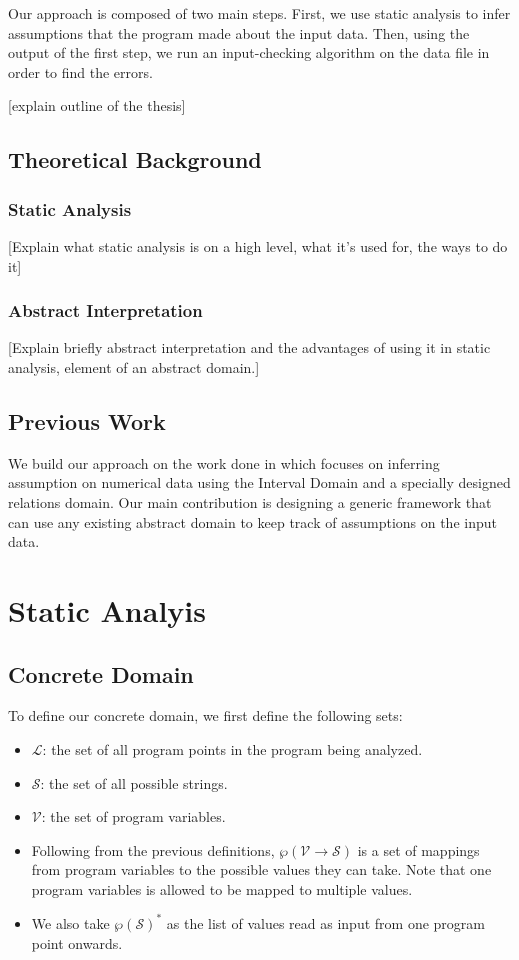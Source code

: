 \documentclass[]{report}
\begin{document}
Our approach is composed of two main steps. First, we use static analysis to infer assumptions that the program made about the input data. Then, using the output of the first step, we run an input-checking algorithm on the data file in order to find the errors. 

[explain outline of the thesis]

\section{Theoretical Background}
\subsection{Static Analysis}
[Explain what static analysis is on a high level, what it's used for, the ways to do it]
\subsection{Abstract Interpretation}
[Explain briefly abstract interpretation and the advantages of using it in static analysis, element of an abstract domain.]

\section{Previous Work}

We build our approach on the work done in \cite{madelin} which focuses on inferring assumption on numerical data using the Interval Domain and a specially designed relations domain. Our main contribution is designing a generic framework that can use any existing abstract domain to keep track of assumptions on the input data. 

\chapter{Static Analyis}

\section{Concrete Domain}

To define our concrete domain, we first define the following sets:
\begin{itemize}
	\item $\mathcal{L}$: the set of all program points in the program being analyzed. 
	\item $\mathcal{S}$: the set of all possible strings. 
	\item $\mathcal{V}$: the set of program variables.
	\item Following from the previous definitions, $\wp(\mathcal{V} \rightarrow \mathcal{S})$ is a set of mappings from program variables to the possible values they can take. Note that one program  variables is allowed to be mapped to multiple values. 
	\item We also take $\wp(\mathcal{S})^{*}$ as the list of values read as input from one program point onwards.  
\end{itemize}
\end{document}
